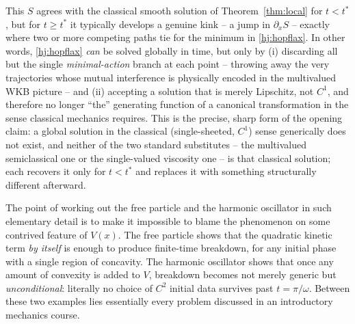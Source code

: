 This $S$ agrees with the classical smooth solution of Theorem~\ref{thm:local}
for $t<t^\ast$, but for $t\ge t^\ast$ it typically develops a genuine kink -- a
jump in $\partial_xS$ -- exactly where two or more competing paths tie for the
minimum in \eqref{hj:hopflax}. In other words, \eqref{hj:hopflax} \emph{can} be
solved globally in time, but only by (i) discarding all but the single
\emph{minimal-action} branch at each point -- throwing away the very
trajectories whose mutual interference is physically encoded in the multivalued
WKB picture -- and (ii) accepting a solution that is merely Lipschitz, not
$C^1$, and therefore no longer ``the'' generating function of a canonical
transformation in the sense classical mechanics requires. This is the precise,
sharp form of the opening claim: a global solution in the classical
(single-sheeted, $C^1$) sense generically does not exist, and neither of the
two standard substitutes -- the multivalued semiclassical one or the
single-valued viscosity one -- is that classical solution; each recovers it
only for $t<t^\ast$ and replaces it with something structurally different
afterward.

The point of working out the free particle and the harmonic oscillator in such
elementary detail is to make it impossible to blame the phenomenon on some
contrived feature of $V(x)$. The free particle shows that the quadratic kinetic
term \emph{by itself} is enough to produce finite-time breakdown, for any
initial phase with a single region of concavity. The harmonic oscillator shows
that once any amount of convexity is added to $V$, breakdown becomes not merely
generic but \emph{unconditional}: literally no choice of $C^2$ initial data
survives past $t=\pi/\omega$. Between these two examples lies essentially every
problem discussed in an introductory mechanics course.

